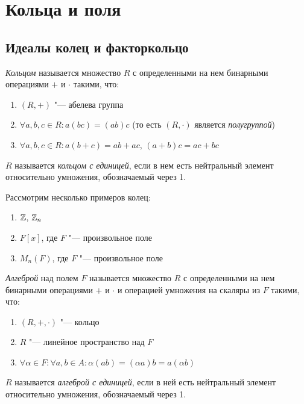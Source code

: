 \section{Кольца и поля}

\subsection{Идеалы колец и факторкольцо}

\begin{reminder}
	\textit{Кольцом} называется множество $R$ с определенными на нем бинарными операциями $+$ и $\cdot$ такими, что:
	\begin{enumerate}
		\item $(R, +)$ "--- абелева группа
		\item $\forall a, b, c \in R: a(bc) = (ab)c$ (то есть $(R, \cdot)$ является \textit{полугруппой})
		\item $\forall a, b, c \in R: a(b + c) = ab + ac$, $(a + b)c = ac + bc$
	\end{enumerate}

	$R$ называется \textit{кольцом с единицей}, если в нем есть нейтральный элемент относительно умножения, обозначаемый через 1.
\end{reminder}

\begin{example}
	Рассмотрим несколько примеров колец:
	\begin{enumerate}
		\item $\mathbb{Z}$, $\mathbb{Z}_n$
		\item $F[x]$, где $F$ "--- произвольное поле
		\item $M_n(F)$, где $F$ "--- произвольное поле
	\end{enumerate}
\end{example}

\begin{reminder}
	\textit{Алгеброй} над полем $F$ называется множество $R$ с определенными на нем бинарными операциями $+$ и $\cdot$ и операцией умножения на скаляры из $F$ такими, что:
	\begin{enumerate}
		\item $(R, +, \cdot)$ "--- кольцо
		\item $R$ "--- линейное пространство над $F$
		\item $\forall \alpha \in F: \forall a, b \in A: \alpha(ab) = (\alpha a)b = a(\alpha b)$
	\end{enumerate}

	$R$ называется \textit{алгеброй с единицей}, если в ней есть нейтральный элемент относительно умножения, обозначаемый через 1.
\end{reminder}

